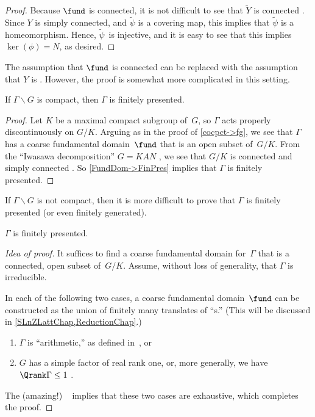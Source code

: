 \begin{proof}
Because $\fund$ is connected, it is not difficult to see
that $\widetilde{Y}$ is connected .
Since $Y$ is simply connected, and $\widetilde \psi$ is a
covering map, this implies that $\widetilde \psi$ is a
homeomorphism. 
Hence, $\widetilde \psi$~is injective, and it is easy to see that this implies
$\ker(\phi) = N$, as desired.
 \end{proof}

\begin{rem} \label{LocConn->FinPres}
 The assumption that $\fund$ is connected can be replaced
with the assumption that $Y$ is .
However, the proof is somewhat more complicated in this
setting.
 \end{rem}

\begin{cor}
 If\/ $\Gamma \backslash G$ is compact, then\/ $\Gamma$ is
finitely presented.
 \end{cor}

\begin{proof}
 Let $K$ be a maximal compact subgroup of~$G$,
 so $\Gamma$ acts properly discontinuously on $G/K$.
 Arguing as in the proof of
\cref{cocpct->fg}, we see that $\Gamma$ has a
coarse fundamental domain~$\fund$ that is an open subset of~$G/K$.
From the ``Iwasawa decomposition'' $G = KAN$ , we see that $G/K$ is connected and simply connected .
So \cref{FundDom->FinPres} implies that $\Gamma$ is finitely presented.
 \end{proof}

If $\Gamma \backslash G$ is not compact, then it is more
difficult to prove that $\Gamma$ is finitely presented (or
even finitely generated). 

\begin{thm} \label{GammaFinPres} \label{GammaFinGen}
 $\Gamma$ is finitely presented.
 \end{thm}

\begin{proof}[Idea of proof]
 It suffices to find a coarse fundamental domain for~$\Gamma$
that is a connected, open subset of~$G/K$. Assume, without
loss of generality, that $\Gamma$ is irreducible. 

 In each of the following two cases, a coarse fundamental
domain~$\fund$ can be constructed as the union of
finitely many translates of ``s\zz.'' (This will
be discussed in \cref{SLnZLattChap,ReductionChap}.)
 \begin{enumerate}
 \item \label{GammaFPrank2}
 $\Gamma$ is ``arithmetic\zz,'' as defined
in~, or
 \item \label{GammaFinPresPf-Rank1}
 $G$ has a simple factor of real rank one, or,
more generally, we have $\Qrank \Gamma \le 1$ .
 \end{enumerate}
 The (amazing!) ~ implies that these two cases
are exhaustive, which completes the proof.
 \end{proof}

